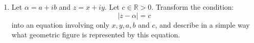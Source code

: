 \begin{enumerate}
\begin{enumerate}
		\item $|z| - |w| \leq |z - w|$ \\
		
		\textbf{Proof:} \\
		By (a) above we just subtract $|w|$ off the right and left, and have a logically equivalent statement.
		\qed


		\item $|z| - |w| \leq |z + w|$ \\
		
		\textbf{Proof:} \\
		If the above were not true, then (b) would be false, but (b) is true, so then: 
		\[|z| -|w| \leq |z + w| \]
		\qed
	\end{enumerate}
	
	\item Let $\alpha = a +ib$ and $z = x +iy.$ Let $c \in \mathbb{R} > 0.$ Transform the condition:
	$$|z - \alpha| = c$$
	into an equation involving only $x, y, a, b$ and $c$, and describe in a simple way what geometric figure is represented by this equation.
	

\end{enumerate}
